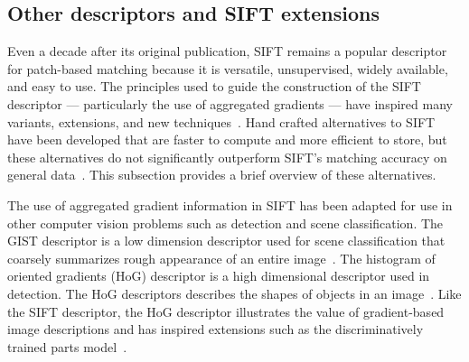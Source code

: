 
    
       \vizfeatrow{}

    \subsection{Other descriptors and SIFT extensions}
        Even a decade after its original publication, SIFT remains a
          popular descriptor for patch-based matching because it is
          versatile, unsupervised, widely available, and easy to use.
        The principles used to guide the construction of the SIFT
          descriptor --- particularly the use of aggregated gradients ---
          have inspired many variants, extensions, and new
          techniques~\cite{mikolajczyk_performance_2005,
          dalal_histograms_2005, bay_surf_2006}.
        Hand crafted alternatives to SIFT have been developed that are
          faster to compute and more efficient to store, but these
          alternatives do not significantly outperform SIFT's matching
          accuracy on general data~\cite{lowe_distinctive_2004,
          mikolajczyk_performance_2005, alahi_freak_2012}.
        This subsection provides a brief overview of these
          alternatives.

        The use of aggregated gradient information in SIFT has been
          adapted for use in other computer vision problems such as
          detection and scene classification.
        The GIST descriptor is a low dimension descriptor used for
          scene classification that coarsely summarizes rough appearance
          of an entire image~\cite{oliva_modeling_2001,
          douze_evaluation_2009}.
        The histogram of oriented gradients (HoG) descriptor is a high
          dimensional descriptor used in detection.
        The HoG descriptors describes the shapes of objects in an
          image~\cite{dalal_histograms_2005}.
        Like the SIFT descriptor, the HoG descriptor illustrates the
          value of gradient-based image descriptions and has inspired
          extensions such as the discriminatively trained parts
          model~\cite{felzenszwalb_object_2010}.

